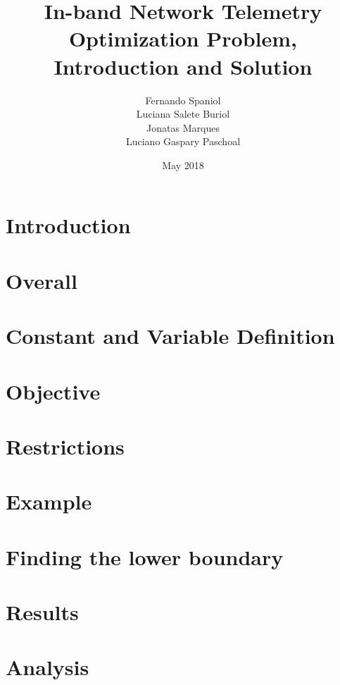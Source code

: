 \documentclass{article}
\title{In-band Network Telemetry Optimization Problem, Introduction and Solution}
\author{ Fernando Spaniol \\ Luciana Salete Buriol \\ Jonatas Marques \\ Luciano Gaspary Paschoal}
\date{May 2018}
\begin{document}
\maketitle

\section{Introduction}



\section{Overall}



\section{Constant and Variable Definition}



\section{Objective}



\section{Restrictions}



\section{Example}



\section{Finding the lower boundary}



\section{Results}



\section{Analysis}


\end{document}
